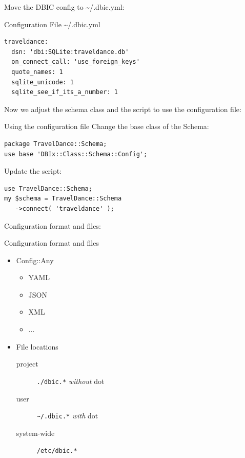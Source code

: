Move the DBIC config to \textasciitilde/.dbic.yml:

\begin{frame}[fragile]{Configuration File \textasciitilde/.dbic.yml}
\begin{lstlisting}
traveldance:
  dsn: 'dbi:SQLite:traveldance.db'
  on_connect_call: 'use_foreign_keys'
  quote_names: 1
  sqlite_unicode: 1
  sqlite_see_if_its_a_number: 1
\end{lstlisting}
\end{frame}

Now we adjust the schema class and the script to use
the configuration file:

\begin{frame}[fragile]{Using the configuration file}
Change the base class of the Schema:

\begin{lstlisting}
package TravelDance::Schema;
use base 'DBIx::Class::Schema::Config';
\end{lstlisting}

Update the script:

\begin{lstlisting}
use TravelDance::Schema;
my $schema = TravelDance::Schema
   ->connect( 'traveldance' );
\end{lstlisting}
\end{frame}

Configuration format and files:

\begin{frame}[fragile]{Configuration format and files}
\begin{itemize}
\item Config::Any
\begin{itemize}
\item YAML
\item JSON
\item XML
\item ...
\end{itemize}
\item File locations
\begin{description}
\item[project] \verb|./dbic.*| \emph{without} dot
\item[user] \verb|~/.dbic.*| \emph{with} dot
\item[system-wide] \verb|/etc/dbic.*|
\end{description}
\end{itemize}
\end{frame}

